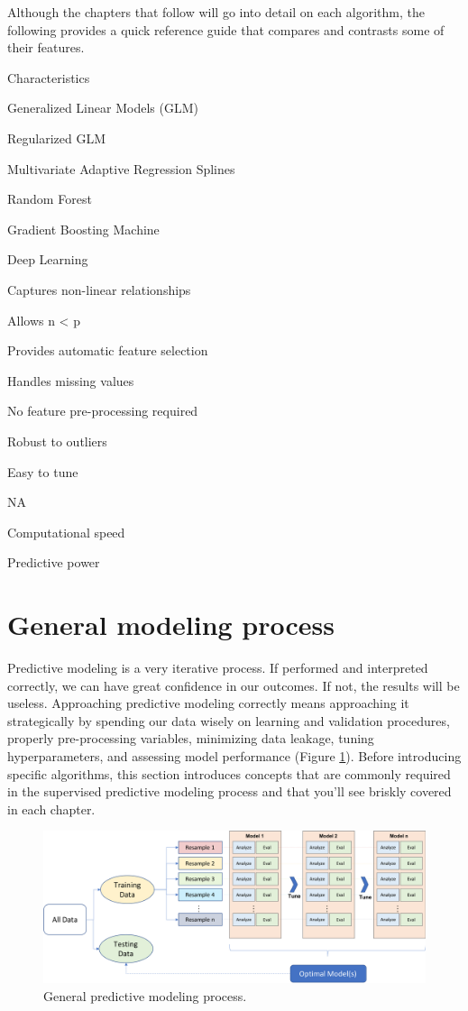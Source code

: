 \documentclass[]{book}
\theoremstyle{definition}
\theoremstyle{definition}
\theoremstyle{definition}
\theoremstyle{remark}
\begin{document}
Although the chapters that follow will go into detail on each algorithm,
the following provides a quick reference guide that compares and
contrasts some of their features.

Characteristics

Generalized Linear Models (GLM)

Regularized GLM

Multivariate Adaptive Regression Splines

Random Forest

Gradient Boosting Machine

Deep Learning

Captures non-linear relationships

Allows n \textless{} p

Provides automatic feature selection

Handles missing values

No feature pre-processing required

Robust to outliers

Easy to tune

NA

Computational speed

Predictive power

\hypertarget{general-modeling-process}{%
\section{General modeling process}\label{general-modeling-process}}

Predictive modeling is a very iterative process. If performed and
interpreted correctly, we can have great confidence in our outcomes. If
not, the results will be useless. Approaching predictive modeling
correctly means approaching it strategically by spending our data wisely
on learning and validation procedures, properly pre-processing
variables, minimizing data leakage, tuning hyperparameters, and
assessing model performance (Figure \ref{fig:06-modeling-process}).
Before introducing specific algorithms, this section introduces concepts
that are commonly required in the supervised predictive modeling process
and that you'll see briskly covered in each chapter.

\begin{figure}

{\centering \includegraphics[width=0.9\linewidth,height=0.9\textheight]{illustrations/modeling_process2} 

}

\caption{General predictive modeling process.}\label{fig:06-modeling-process}
\end{figure}
\end{document}
